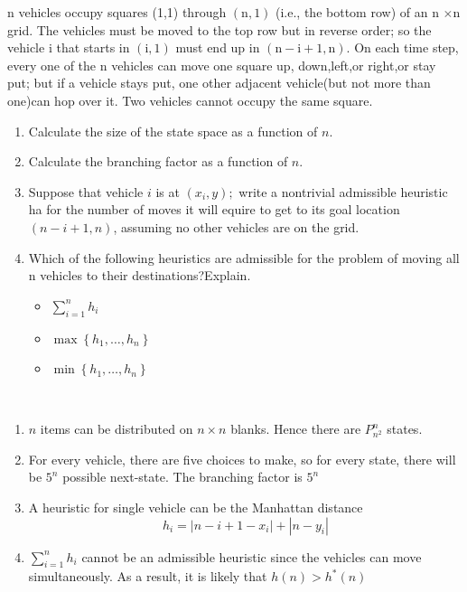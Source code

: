 \begin{exercise}[Search]{n vehicles occupy squares (1,1) through $(\mathrm{n}, 1)$ (i.e., the bottom row) of an $\mathrm{n}$ $\times \mathrm{n}$ grid. The vehicles must be moved to the top row but in reverse order; so the vehicle i that starts in $(\mathrm{i}, 1)$ must end up in $(\mathrm{n}-\mathrm{i}+1, \mathrm{n}) .$ On each time step, every one of the n vehicles can move one square up, down,left,or right,or stay put; but if a vehicle stays put, one other adjacent vehicle(but not more than one)can hop over it. Two vehicles cannot occupy the same square.
  \begin{enumerate}
    \item Calculate the size of the state space as a function of $n .$
    \item Calculate the branching factor as a function of $n .$
    \item Suppose that vehicle $i$ is at $\left(x_{i}, y\right) ;$ write a nontrivial admissible heuristic ha for the number of moves it will equire to get to its goal location $(n-i+1, n)$, assuming no other vehicles are on the grid.
    \item {Which of the following heuristics are admissible for the problem of moving all n vehicles to their destinations?Explain.
    \begin{itemize}
      \item $\sum_{i=1}^{n} h_{i}$
      \item $\max \left\{h_{1}, \ldots, h_{n}\right\}$
      \item $\min \left\{h_{1}, \ldots, h_{n}\right\}$
    \end{itemize}}
  \end{enumerate}}
  \begin{solution}
  \par{~}
  \begin{enumerate}
    \item {
      $n$ items can be distributed on $n\times n$ blanks. Hence there are $P_{n^2}^{n}$ states.
    }
    \item {
      For every vehicle, there are five choices to make, so for every state, there will be $5^n$ possible next-state. The branching factor is $5^n$
    }
    \item {
      A heuristic for single vehicle can be the Manhattan distance
      \begin{equation}
        h_i = \left| n - i + 1 - x_i\right| + \left| n - y_i \right|
      \end{equation}
    }
    \item {
      $\sum_{i=1}^{n} h_{i}$ cannot be an admissible heuristic since the vehicles can move simultaneously. As a result, it is likely that $h(n)>h^{*}(n)$

}
\end{enumerate}
\end{solution}
\end{exercise}
